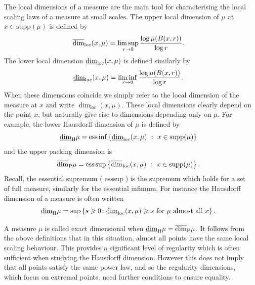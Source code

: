 The local dimensions of a measure are the main tool for characterising the local scaling laws of a measure at small scales. The upper local dimension of $\mu$ at $x \in \text{supp}(\mu)$ is defined by
\[
\ulocal=\limsup_{r\rightarrow 0} \frac{\log \mu(B(x,r))}{\log r}.
\]
The lower local dimension $\llocal$ is defined similarly by
\[
\llocal=\liminf_{r\rightarrow 0} \frac{\log \mu(B(x,r))}{\log r}.
\]
When these dimensions coincide we simply refer to the local dimension of the measure at $x$ and write $\dim_{\text{loc}}(x,\mu)$. These local dimensions clearly depend on the point $x$, but naturally give rise to dimensions depending only on $\mu$. For example, the lower Hausdorff dimension of $\mu$ is defined by
\[
\underline{\dim}_\H \mu=\text{ess}  \inf \left\{  \underline{\dim}_{\text{loc}}(x,\mu)  \ : \  x\in \text{supp}(\mu) \right\} 
\]
and the upper packing dimension is
\[
\overline{\dim}_\P \mu=\text{ess}  \sup \left\{ \overline{\dim}_{\text{loc}}(x,\mu) \ : \  x\in \text{supp}(\mu) \right\}.
\]
Recall, the essential supremum ($\text{ess} \sup$) is the supremum which holds for a set of full measure, similarly for the essential infimum. For instance the Hausdorff dimension of a measure is often written $$\underline{\dim}_\H \mu = \sup\left\{ s \ge 0 \colon \llocal \ge s  \text{ for $\mu$ almost all }x  \right\}.$$ 

A measure $\mu$ is called exact dimensional when $\underline{\dim}_\H \mu=\overline{\dim}_\P \mu$. It follows from the above definitions that in this situation, almost all points have the same local scaling behaviour. This provides a significant level of regularity which is often sufficient when studying the Hausdorff dimension. However this does not imply that all points satisfy the same power law, and so the regularity dimensions, which focus on extremal points, need further conditions to ensure equality.


